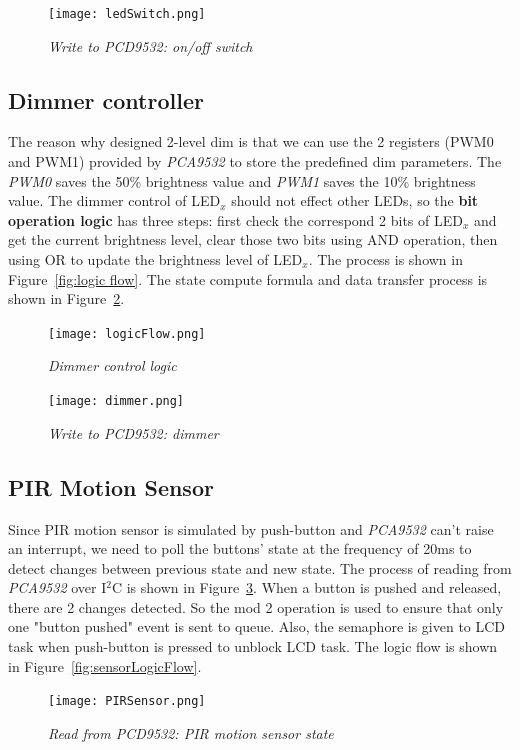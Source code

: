 \begin{figure}[H]
\centering
\texttt{[image: ledSwitch.png]}
\caption{\label{fig:switch}\textit{Write to PCD9532: on/off switch }}
\end{figure}

\subsection{Dimmer controller}

The reason why designed 2-level dim is that we can use the 2 registers (PWM0 and PWM1) provided by \textit{PCA9532} to store the predefined dim parameters. The \textit{PWM0} saves the 50\% brightness value and \textit{PWM1} saves the 10\% brightness value. The dimmer control of LED$_x$ should not effect other LEDs, so the \textbf{bit operation logic} has three steps: first check the correspond 2 bits of LED$_x$ and get the current brightness level, clear those two bits using AND operation, then using OR to update the brightness level of LED$_x$. The process is shown in Figure~\ref{fig:logic flow}. The state compute formula and data transfer process is shown in Figure~\ref{fig:dimmer}.

\begin{figure}[H]
\centering
\texttt{[image: logicFlow.png]}
\caption{\label{fig:logic flow}\textit{Dimmer control logic}}
\centering
\texttt{[image: dimmer.png]}
\caption{\label{fig:dimmer}\textit{Write to PCD9532: dimmer }}
\end{figure}

\subsection{PIR Motion Sensor}
Since PIR motion sensor is simulated by push-button and \textit{PCA9532} can't raise an interrupt, we need to poll the buttons' state at the frequency of 20ms to detect changes between previous state and new state. The process of reading from \textit{PCA9532} over I$^2$C is shown in Figure~\ref{fig:PIRSensor}. When a button is pushed and released, there are 2 changes detected. So the mod 2 operation is used to ensure that only one "button pushed" event is sent to queue. Also, the semaphore is given to LCD task when push-button is pressed to unblock LCD task. The logic flow is shown in Figure~\ref{fig:sensorLogicFlow}.

\begin{figure}[H]
\centering
\texttt{[image: PIRSensor.png]}
\caption{\label{fig:PIRSensor}\textit{Read from PCD9532: PIR motion sensor state}}
\end{figure}

